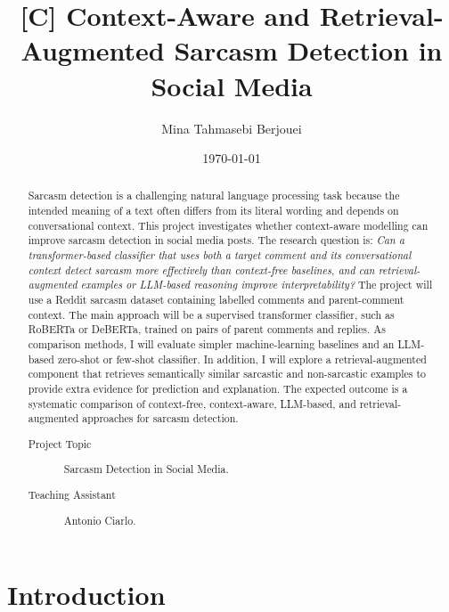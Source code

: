 \documentclass[%
 reprint,
 amsmath,amssymb,
 aps,
]{revtex4-2}
\begin{document}
\title{[C] Context-Aware and Retrieval-Augmented Sarcasm Detection in Social Media}%

\author{Mina Tahmasebi Berjouei}

\date{\today}%

\begin{abstract} %
Sarcasm detection is a challenging natural language processing task because the intended meaning of a text often differs from its literal wording and depends on conversational context. This project investigates whether context-aware modelling can improve sarcasm detection in social media posts. The research question is: \emph{Can a transformer-based classifier that uses both a target comment and its conversational context detect sarcasm more effectively than context-free baselines, and can retrieval-augmented examples or LLM-based reasoning improve interpretability?} The project will use a Reddit sarcasm dataset containing labelled comments and parent-comment context. The main approach will be a supervised transformer classifier, such as RoBERTa or DeBERTa, trained on pairs of parent comments and replies. As comparison methods, I will evaluate simpler machine-learning baselines and an LLM-based zero-shot or few-shot classifier. In addition, I will explore a retrieval-augmented component that retrieves semantically similar sarcastic and non-sarcastic examples to provide extra evidence for prediction and explanation. The expected outcome is a systematic comparison of context-free, context-aware, LLM-based, and retrieval-augmented approaches for sarcasm detection.

\begin{description} %
\item[Project Topic] %
{Sarcasm Detection in Social Media.}
\item[Teaching Assistant] %
{Antonio Ciarlo.}
\end{description} %
\end{abstract}

\maketitle




\section{\label{sec:intro}Introduction} %
\end{document}
